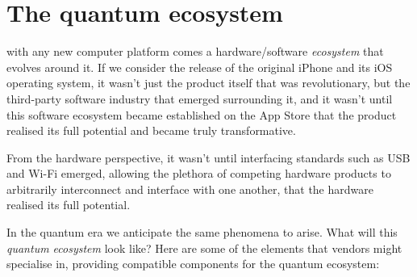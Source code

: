 %
%

\section{The quantum ecosystem}

\newline

 with any new computer platform comes a hardware/software \textit{ecosystem} that evolves around it. If we consider the release of the original iPhone and its iOS operating system, it wasn't just the product itself that was revolutionary, but the third-party software industry that emerged surrounding it, and it wasn't until this software ecosystem became established on the App Store that the product realised its full potential and became truly transformative.

From the hardware perspective, it wasn't until interfacing standards such as USB and Wi-Fi emerged, allowing the plethora of competing hardware products to arbitrarily interconnect and interface with one another, that the hardware realised its full potential.

In the quantum era we anticipate the same phenomena to arise. What will this \textit{quantum ecosystem} look like? Here are some of the elements that vendors might specialise in, providing compatible components for the quantum ecosystem:

